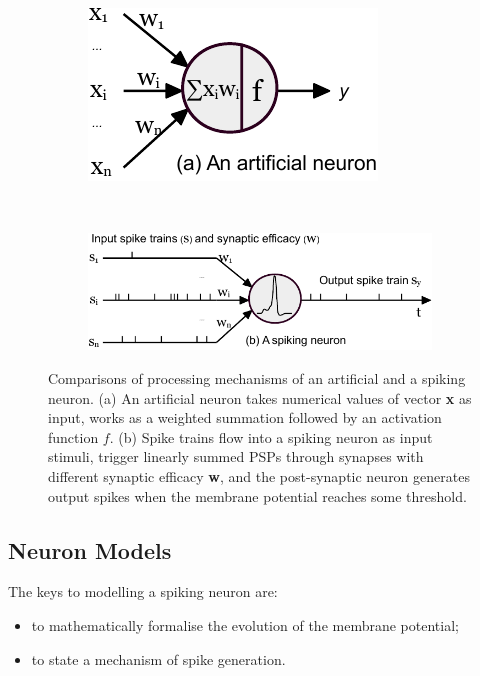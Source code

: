 	\begin{figure}[tb!]
		\centering
		\begin{subfigure}[t]{0.28\textwidth}
			\includegraphics[width=\textwidth]{pics_snn/neuron_ann.pdf}
		\end{subfigure}~
		\begin{subfigure}[t]{0.65\textwidth}
			\includegraphics[width=\textwidth]{pics_snn/neuron_snn.pdf}
		\end{subfigure}
		\caption[Comparisons of an artificial and a spiking neuron.]{Comparisons of processing mechanisms of an artificial and a spiking neuron. (a) An artificial neuron takes numerical values of vector \textbf{x} as input, works as a weighted summation followed by an activation function $f$. (b) Spike trains flow into a spiking neuron as input stimuli, trigger linearly summed PSPs through synapses with different synaptic efficacy \textbf{w}, and the post-synaptic neuron generates output spikes when the membrane potential reaches some threshold.}
		\label{Fig:compare_as}
	\end{figure}
	
\subsection{Neuron Models}
\label{subsec:neuron_model}
The keys to modelling a spiking neuron are: 
\begin{itemize}
	\item to mathematically formalise the evolution of the membrane potential;
	\item to state a mechanism of spike generation.
\end{itemize}

